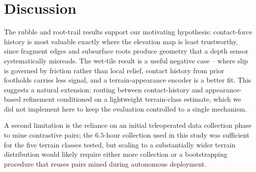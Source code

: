 \section{Discussion}
The rubble and root-trail results support our motivating hypothesis: contact-force history is
most valuable exactly where the elevation map is least trustworthy, since fragment edges and
subsurface roots produce geometry that a depth sensor systematically misreads. The wet-tile
result is a useful negative case -- where slip is governed by friction rather than local
relief, contact history from prior footholds carries less signal, and a terrain-appearance
encoder is a better fit. This suggests a natural extension: routing between contact-history and
appearance-based refinement conditioned on a lightweight terrain-class estimate, which we did
not implement here to keep the evaluation controlled to a single mechanism.

A second limitation is the reliance on an initial teleoperated data collection phase to mine
contrastive pairs; the $6.5$-hour collection used in this study was sufficient for the five
terrain classes tested, but scaling to a substantially wider terrain distribution would likely
require either more collection or a bootstrapping procedure that reuses pairs mined during
autonomous deployment.
